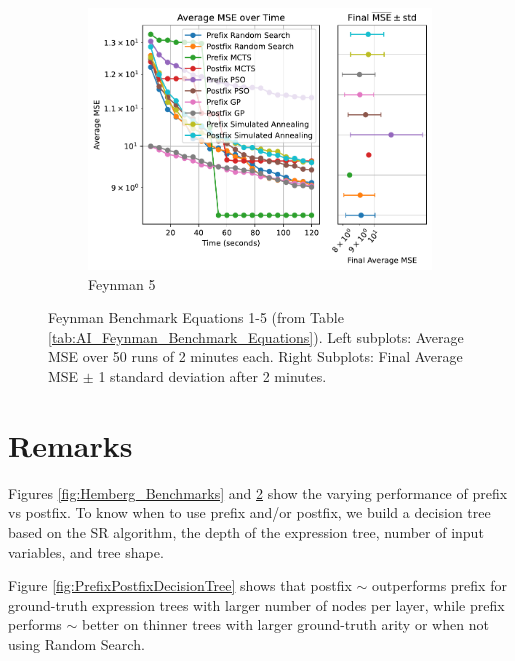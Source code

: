 \documentclass[runningheads]{llncs}
\begin{document}
\begin{figure}
    \vspace{0.5cm}
    
    \begin{subfigure}[b]{0.4\textwidth}
        \includegraphics[width=\linewidth, keepaspectratio]{AIFeynman_Benchmarks/Feynman_Benchmark_5.pdf}
        \caption{Feynman 5}
        \label{subfig:feynman_5}
    \end{subfigure}
    
    \caption{Feynman Benchmark Equations 1-5 (from Table \ref{tab:AI_Feynman_Benchmark_Equations}). Left subplots: Average MSE over 50 runs of 2 minutes each. Right Subplots: Final Average MSE $\pm$ 1 standard deviation after 2 minutes.}
    \label{fig:Feynman_Benchmarks}
\end{figure}

\section{Remarks}

Figures \ref{fig:Hemberg_Benchmarks} and \ref{fig:Feynman_Benchmarks} show the varying performance of prefix vs postfix. To know when to use prefix and/or postfix, we build a decision tree based on the SR algorithm, the depth of the expression tree, number of input variables, and tree shape.
\par Figure \ref{fig:PrefixPostfixDecisionTree} shows that postfix $\sim$  outperforms prefix for ground-truth expression trees with larger number of nodes per layer, while prefix performs $\sim$ better on thinner trees with larger ground-truth arity or when not using Random Search.
\end{document}
